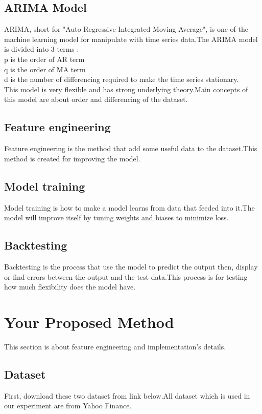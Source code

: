 \documentclass{article}
\begin{document}
\subsection{ARIMA Model}
ARIMA, short for "Auto Regressive Integrated Moving Average", is one of the machine learning model for manipulate with time series data.The ARIMA model is divided into 3 terms :\\p is the order of AR term\\q is the order of MA term\\d is the number of differencing required to make the time series stationary.\\This model is very flexible and has strong underlying theory.Main concepts of this model are about order and differencing of the dataset. 

\subsection{Feature engineering}
Feature engineering is the method that add some useful data to the dataset.This method is created for improving the model.

\subsection{Model training}
Model training is how to make a model learns from data that feeded into it.The model will improve itself by tuning weights and biases to minimize loss.

\subsection{Backtesting}
Backtesting is the process that use the model to predict the output then, display or find errors between the output and the test data.This process is for testing how much flexibility does the model have. 

\section{Your Proposed Method}\label{sec:yourmethod}
This section is about feature engineering and implementation's details.

\subsection{Dataset}
First, download these two dataset from link below.All dataset which is used in our experiment are from Yahoo Finance.
\end{document}
